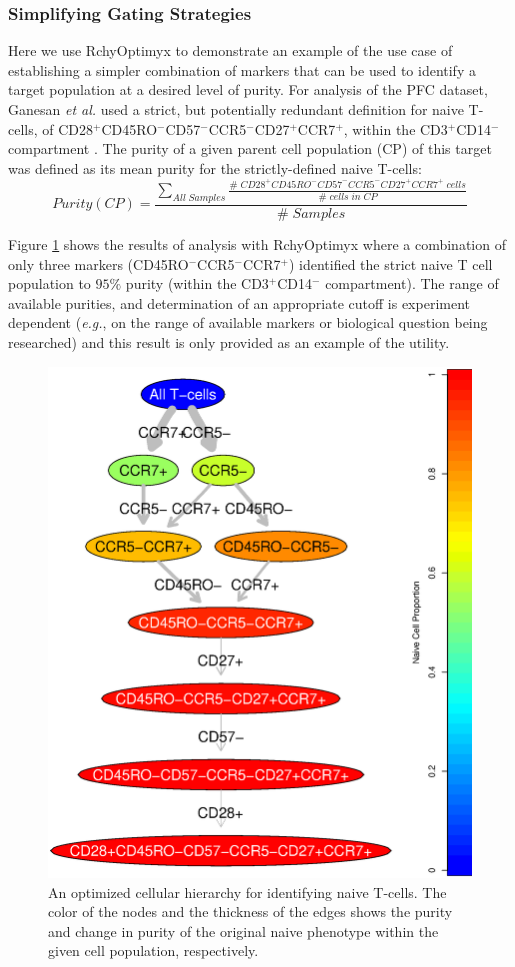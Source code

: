 \subsubsection{Simplifying Gating Strategies}

Here we use RchyOptimyx to demonstrate  an example of the use case of establishing  a simpler combination of markers that can be used to  identify a target population at a desired level of purity. 
For analysis of the PFC dataset, Ganesan \emph{et al.} used a strict, but potentially redundant definition for naive T-cells, of CD28$^+$CD45RO$^-$CD57$^-$CCR5$^-$CD27$^+$CCR7$^+$, within the CD3$^+$CD14$^-$ compartment \cite{Ganesan2010Immunologic}.
The purity of a given parent cell population (CP) of  this target was defined as its mean purity for the strictly-defined naive T-cells:
\begin{equation}
  Purity(CP)=\frac{\sum_{All \; Samples}\frac{\# \; CD28^+ CD45RO^- CD57^- CCR5^- CD27^+ CCR7^+ \; cells}{\# \; cells \; in \; CP}}{\# \; Samples}
\end{equation}

Figure \ref{r1:NaiveOverlap} shows the results of analysis with RchyOptimyx where a combination of only three markers (CD45RO$^-$CCR5$^-$CCR7$^+$) identified the strict naive T cell population to $95\%$ purity (within the CD3$^+$CD14$^-$ compartment).
The range of available purities, and determination of an appropriate cutoff is experiment dependent (\emph{e.g.}, on the range of available markers or biological question being researched) and this result is only provided as an example of the utility. 

\begin{figure}[ht]
  \begin{center}
    \includegraphics[width=.7\textwidth]{figs/rchy/NaiveOverlap}
  \end{center}
  \caption{An optimized cellular hierarchy for identifying naive T-cells. The color of the nodes and the thickness of the edges shows the purity and change in purity of the original naive phenotype within the given cell population, respectively.
  }
  \label{r1:NaiveOverlap}
\end{figure}


